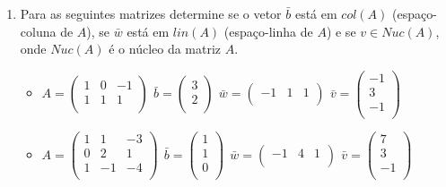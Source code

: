 \documentclass{article}
\theoremstyle{plain}
\theoremstyle{obs}
\numberwithin{equation}{section}
\begin{document}
\begin{enumerate}
    \item Para as seguintes matrizes determine se o vetor $\bar{b}$
    está em $col(A)$ (espaço-coluna de $A$), se 
    $\bar{w}$ está em $lin(A)$ (espaço-linha de $A$)
    e se $v \in Nuc(A)$, onde $Nuc(A)$ é o núcleo da matriz $A$.
     \begin{itemize}
        \item  
       $
       A=
       \begin{pmatrix}
       1 & 0 & -1 \\
       1 & 1 & 1 \\
       \end{pmatrix}
       \ \,  
       \bar{b}=
       \begin{pmatrix}
       3 \\
       2 \\
       \end{pmatrix}
       \ \,  
       \bar{w}=
       \begin{pmatrix}
       -1 & 1 & 1\\
       \end{pmatrix}
       \ \, 
       \bar{v}=
       \begin{pmatrix}
       -1 \\
       3 \\
       -1 \\
       \end{pmatrix}
       $
       \item  
       $
       A=
       \begin{pmatrix}
       1 & 1 & -3 \\
       0 & 2 & 1 \\
       1 & -1 & -4 \\
       \end{pmatrix}
       \ \ 
       \bar{b}=
       \begin{pmatrix}
       1 \\
       1 \\
       0 \\
       \end{pmatrix}
       \ \ 
       \bar{w}=
       \begin{pmatrix}
       -1 & 4 & 1\\
       \end{pmatrix}
       \ \, 
       \bar{v}=
       \begin{pmatrix}
       7 \\
       3 \\
       -1 \\
       \end{pmatrix}
       $
     \end{itemize} 
     

\end{enumerate}
\end{document}
